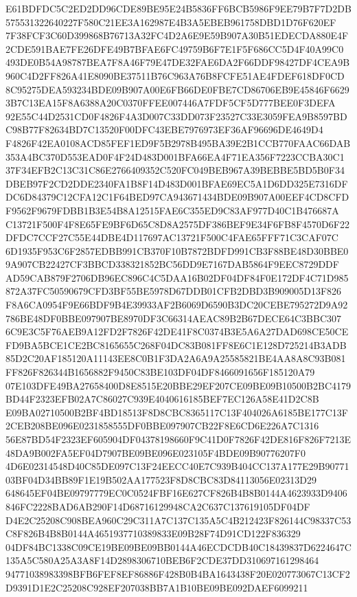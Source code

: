 \documentclass[UTF8,fontset=fandol,zihao=-4,a4paper]{ctexart}
\begin{document}
{{E61BDFDC5C2ED2DD96CDE89BE95E24B5836FF6BCB5986F9EE79B7F7D2DB575531322640227F580C21EE3A162987E4B3A5EBEB961758DBD1D76F620EF
7F38FCF3C60D399868B76713A32FC4D2A6E9E59B907A30B51EDECDA880E4F2CDE591BAE7FE26DFE49B7BFAE6FC49759B6F7E1F5F686CC5D4F40A99C0
493DE0B54A98787BEA7F8A46F79E47DE32FAE6DA2F66DDF98427DF4CEA9B960C4D2FF826A41E8090BE37511B76C963A76B8FCFE51AE4FDEF618DF0CD
8C95275DEA593234BDE09B907A00E6FB66DE0FBE7CD86706EB9E45846F66293B7C13EA15F8A6388A20C0370FFEE007446A7FDF5CF5D777BEE0F3DEFA
92E55C44D2531CD0F4826F4A3D007C33DD073F23527C33E3059FEA9B8597BDC98B77F82634BD7C13520F00DFC43EBE7976973EF36AF96696DE4649D4
F4826F42EA0108ACD85FEF1ED9F5B2978B495BA39E2B1CCB770FAAC66DAB353A4BC370D553EAD0F4F24D483D001BFA66EA4F71EA356F7223CCBA30C1
37F34EFB2C13C31C86E2766409352C520FC049BEB967A39BEBBE5BD5B0F34DBEB97F2CD2DDE2340FA1B8F14D483D001BFAE69EC5A1D6DD325E7316DF
DC6D84379C12CFA12C1F64BED97CA943671434BDE09B907A00EEF4CD8CFDF9562F9679FDBB1B3E54B8A12515FAE6C355ED9C83AF977D40C1B476687A
C13721F500F4F8E65FE9BF6D65C8D8A2575DF386BEF9E34F6FB8F4570D6F22DFDC7CCF27C55E44DBE4D117697AC13721F500C4FAE65FFF71C3CAF07C
6D1935F953C6F2857EDBB991CB370F10B7872BDFD991CB3F88BE48D30BBE09A907CB22427CF3BBCD338321852BC56DD9E7167DAB5864F9EEC8729DDF
AD59CAB879F2706DB96EC896C4C5DAA16B02DF04DF84F0E172DF4C71D985872A37FC50590679CFD3BF55BE5978D67DDB01CFB2DBD3B909005D13F826
F8A6CA0954F9E66BDF9B4E39933AF2B6069D6590B3DC20CEBE795272D9A92786BE48DF0BBE097907BE8970DF3C66314AEAC89B2B67DECE64C3BBC307
6C9E3C5F76AEB9A12FD2F7826F42DE41F8C0374B3E5A6A27DAD698CE50CEFD9BA5BCE1CE2BC8165655C268F04DC83B081FF8E6C1E128D725214B3ADB
85D2C20AF185120A11143EE8C0B1F3DA2A6A9A25585821BE4AA8A8C93B081FF826F826344B1656882F9450C83BE103DF04DF8466091656F185120A79
07E103DFE49BA27658400D8E8515E20BBE29EF207CE09BE09B10500B2BC4179BD44F2323EFB02A7C86027C939E4040616185BEF7EC126A58E41D2C8B
E09BA02710500B2BF4BD18513F8D8CBC8365117C13F404026A6185BE177C13F2CEB208BE096E0231858555DF0BBE097907CB22F8E6CD6E226A7C1316
56E87BD54F2323EF605904DF04378198660F9C41D0F7826F42DE816F826F7213E48DA9B002FA5EF04D7907BE09BE096E023105F4BDE09B90776207F0
4D6E02314548D40C85DE097C13F24EECC40E7C939B404CC137A177E29B9077103BF04D34BB89F1E19B502AA177523F8D8CBC83D84113056E02313D29
648645EF04BE09797779EC0C0524FBF16E627CF826B4B8B0144A4623933D9406846FC2228BAD6AB290F14D68716129948CA2C637C137619105DF04DF
D4E2C25208C908BEA960C29C311A7C137C135A5C4B212423F826144C98337C53C8F826B4B8B0144A4651937710389833E09B28F74D91CD122F836329
04DF84BC1338C09CE19BE09BE09BB0144A46ECDCDB40C18439837D6224647C135A5C580A25A3A8F14D2898306710BEB6F2CDE37DD310697161298464
94771038983398BFB6FEF8EF86886F428B0B4BA1643438F20E020773067C13CF2D9391D1E2C25208C928EF207038BB7A1B10BE09BE092DAEF6099211
}}
\end{document}
